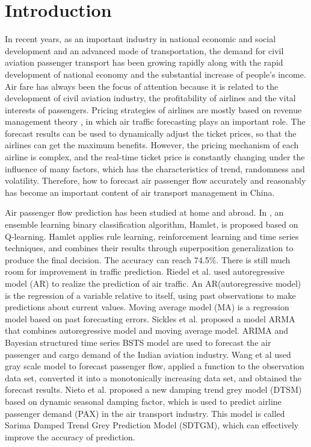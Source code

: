 \documentclass[journal,article,submit,moreauthors,pdftex]{Definitions/mdpi}
\begin{document}
\section{Introduction}
In recent years, as an important industry in national economic and social development and an advanced mode of transportation, the demand for civil aviation passenger transport has been growing rapidly along with the rapid development of national economy and the substantial increase of people's income. Air fare has always been the focus of attention because it is related to the development of civil aviation industry, the profitability of airlines and the vital interests of passengers. Pricing strategies of airlines are mostly based on revenue management theory \cite{1}\cite{2}, in which air traffic forecasting plays an important role. The forecast results can be used to dynamically adjust the ticket prices, so that the airlines can get the maximum benefits. However, the pricing mechanism of each airline is complex, and the real-time ticket price is constantly changing under the influence of many factors, which has the characteristics of trend, randomness and volatility. Therefore, how to forecast air passenger flow accurately and reasonably has become an important content of air transport management in China.
\par Air passenger flow prediction has been studied at home and abroad. In \cite{3}, an ensemble learning binary classification algorithm, Hamlet, is proposed based on Q-learning. Hamlet applies rule learning, reinforcement learning and time series techniques, and combines their results through superposition generalization to produce the final decision. The accuracy can reach 74.5\%. There is still much room for improvement in traffic prediction. Riedel et al. \cite{4} used autoregressive model (AR) to realize the prediction of air traffic. An AR(autoregressive model) is the regression of a variable relative to itself, using past observations to make predictions about current values. Moving average model (MA) is a regression model based on past forecasting errors. Sickles et al. \cite{5} proposed a model ARMA that combines autoregressive model and moving average model. ARIMA\cite{6} and Bayesian structured time series BSTS model\cite{7}\cite{8} are used to forecast the air passenger and cargo demand of the Indian aviation industry. Wang et al \cite{9} used gray scale model to forecast passenger flow, applied a function to the observation data set, converted it into a monotonically increasing data set, and obtained the forecast results. Nieto et al. \cite{10}proposed a new damping trend grey model (DTSM) based on dynamic seasonal damping factor, which is used to predict airline passenger demand (PAX) in the air transport industry. This model is called Sarima Damped Trend Grey Prediction Model (SDTGM), which can effectively improve the accuracy of prediction.
\end{document}

